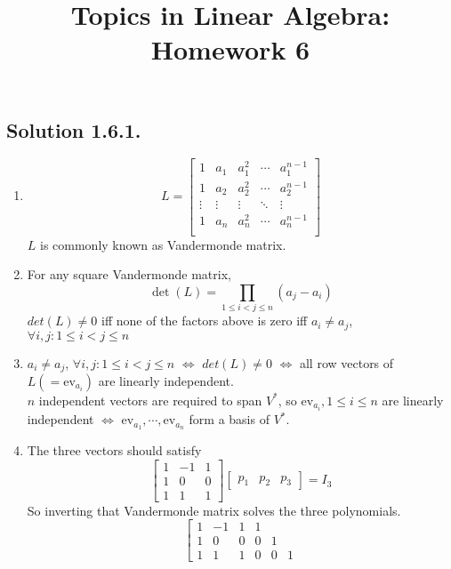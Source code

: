 \documentclass{article}
\title{Topics in Linear Algebra: Homework 6}
\begin{document}
\maketitle
\subsection*{Solution 1.6.1.}
\begin{enumerate}
    \item 
    \[L = \left[
    \begin{array}{ccccc}
    1 & a_1 & a_1 ^ 2 & \cdots & a_1 ^ {n - 1} \\
    1 & a_2 & a_2 ^ 2 & \cdots & a_2 ^ {n - 1} \\
    \vdots & \vdots & \vdots & \ddots & \vdots \\
    1 & a_n & a_n ^ 2 & \cdots & a_n ^ {n - 1} \\
    \end{array}
    \right]
    \]
    $L$ is commonly known as Vandermonde matrix.
    \item For any square Vandermonde matrix, 
    \[\det(L) = \prod _{1\leq i < j \leq n} (a_j - a_i)\]
    $det(L)\neq 0$ iff none of the factors above is zero iff $a_i \neq a_j$, $\forall i,j: 1 \leq i < j \leq n$
    \item 
    $a_i \neq a_j$, $\forall i,j: 1 \leq i < j \leq n$ $\Leftrightarrow$ $det(L) \neq 0$ $\Leftrightarrow$ all row vectors of $L(=\mathrm{ev}_{a_i})$ are linearly independent.\\
    $n$ independent vectors are required to span $V ^ *$, so $\mathrm{ev}_{a_i}, 1\leq i\leq n$ are linearly independent $\Leftrightarrow$ $\mathrm{ev}_{a_1},\cdots,\mathrm{ev}_{a_n}$ form a basis of $V^*$.
    \item The three vectors should satisfy
    \[
    \left[
    \begin{array}{lll}
    1 & -1 & 1 \\
    1 &  0 & 0 \\
    1 &  1 & 1
    \end{array}
    \right]
    \left[
    \begin{array}{lll} p_1 & p_2 & p_3
    \end{array}
    \right]= I_3
    \]
    So inverting that Vandermonde matrix solves the three polynomials.
    \[
    \left[
    \begin{array}{rrrrrr}
    1 & -1 & 1 & 1 \\
    1 & 0  & 0 & 0 & 1 \\
    1 & 1 & 1 & 0 & 0 & 1

\end{array}\]
\end{enumerate}
\end{document}
